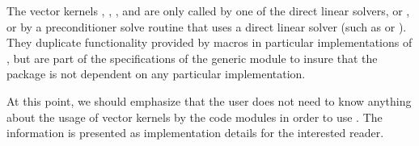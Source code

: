The vector kernels , , , and
 are only called by one of the {\cvodes} direct linear solvers, 
{\cvdense} or {\cvband}, or by a preconditioner solve routine that uses a 
direct linear solver (such as {\cvbandpre}  or {\cvbbdpre}). They duplicate 
functionality provided by macros in particular implementations of {\nvector},
but are part of the specifications of the generic {\nvector} module to insure 
that the {\cvodes} package is not dependent on any particular {\nvector} implementation.

At this point, we should emphasize that the {\cvodes} user does not need to know 
anything about the usage of vector kernels by the {\cvodes} code modules in order 
to use {\cvodes}. The information is presented as implementation details for the 
interested reader.

